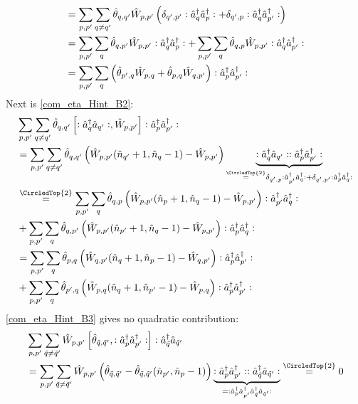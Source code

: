 \begin{appendix}
\begin{itemize}
\begin{align}
&=\sum\limits_{p, p^\prime}\sum\limits_{q\neq q^\prime} \hat\theta_{ q, q^\prime}\hat W_{p,p^\prime}\left(\delta_{q^\prime,p^\prime}\vcentcolon\hat a^\dagger_q\hat a^\dagger_p\vcentcolon+\delta_{q^\prime,p}\vcentcolon\hat a^\dagger_q\hat a^\dagger_{p^\prime}\vcentcolon\right)\nonumber \\
&=\sum\limits_{p, p^\prime}\sum\limits_{q} \hat\theta_{ q, p^\prime}\hat W_{p,p^\prime}\vcentcolon\hat a^\dagger_q\hat a^\dagger_p\vcentcolon+\sum\limits_{p, p^\prime}\sum\limits_{q} \hat\theta_{ q, p}\hat W_{p,p^\prime}\vcentcolon\hat a^\dagger_q\hat a^\dagger_{p^\prime}\vcentcolon\nonumber \\
&=\sum\limits_{p, p^\prime}\sum\limits_{q}\left(\hat\theta_{ p^\prime, q}\hat W_{p,q}+\hat\theta_{ p,q}\hat W_{q,p^\prime}\right)\vcentcolon\hat a^\dagger_p\hat a^\dagger_{p^\prime}\vcentcolon
\end{align}
Next is \ref{com_eta_Hint_B2}:
\begin{align}
&\Sum_{p, p^\prime}\Sum_{ q\neq q^\prime} \hat\theta_{ q, q^\prime}\left[\NO\CR_{ q}\AN_{ q^\prime}\NO,\hat W_{p,p^\prime}\right]\NO\CR_p\CR_{p^\prime}\NO\nonumber \\
&= \Sum_{p, p^\prime}\Sum_{ q\neq q^\prime} \hat\theta_{ q, q^\prime}\left(\hat W_{p,p^\prime}(\hat n_{q^\prime}+1,\hat n_q-1)- \hat W_{p,p^\prime}\right)\underbrace{\NO\CR_{ q}\AN_{ q^\prime}\NO\NO\CR_p\CR_{p^\prime}\NO}_{\overset{\CircledTop{2}}{=}\delta_{q^\prime,p}\NO\CR_{p^\prime}\CR_q\NO+\delta_{q^\prime,p^\prime}\NO\CR_p\CR_q\NO}\nonumber \\
&\overset{\CircledTop{2}}{=} \Sum_{p, p^\prime}\Sum_{ q} \hat\theta_{ q, p}\left(\hat W_{p,p^\prime}(\hat n_{p}+1,\hat n_q-1)- \hat W_{p,p^\prime}\right)\NO\CR_{p^\prime}\CR_q\NO\nonumber \\
&+\Sum_{p, p^\prime}\Sum_{ q} \hat\theta_{ q, p^\prime}\left(\hat W_{p,p^\prime}(\hat n_{p^\prime}+1,\hat n_q-1)- \hat W_{p,p^\prime}\right)\NO\CR_p\CR_q\NO\nonumber \\
&= \Sum_{p, p^\prime}\Sum_{ q} \hat\theta_{ p,q}\left(\hat W_{q,p^\prime}(\hat n_{q}+1,\hat n_p-1)- \hat W_{q,p^\prime}\right)\NO\CR_p\CR_{p^\prime}\NO\nonumber \\
&+\Sum_{p, p^\prime}\Sum_{ q} \hat\theta_{ p^\prime,q}\left(\hat W_{p,q}(\hat n_{q}+1,\hat n_{p^\prime}-1)- \hat W_{p,q}\right)\NO\CR_p\CR_{p^\prime}\NO
\end{align}
\ref{com_eta_Hint_B3} gives no quadratic contribution:
\begin{align}
&\Sum_{p, p^\prime}\Sum_{\tilde q\neq\tilde q^\prime} \hat W_{p,p^\prime}\left[\hat\theta_{\tilde q,\tilde q^\prime},\NO\CR_p\CR_{p^\prime}\NO\right]\NO\CR_{\tilde q}\AN_{\tilde q^\prime}\nonumber\\ 
&=\Sum_{p, p^\prime}\Sum_{\tilde q\neq\tilde q^\prime} \hat W_{p,p^\prime}\left(\hat\theta_{\tilde q,\tilde q^\prime}-\hat\theta_{\tilde q,\tilde q^\prime}(\hat n_{p^\prime},\hat n_p-1)\right)\underbrace{\NO\CR_p\CR_{p^\prime}\NO\NO\CR_{\tilde q}\AN_{\tilde q^\prime}\NO}_{=\NO\CR_p\CR_{p^\prime}\CR_{\tilde q}\AN_{\tilde q^\prime}\NO} \overset{\CircledTop{2}}{=} 0

\end{align}
\end{itemize}
\end{appendix}
